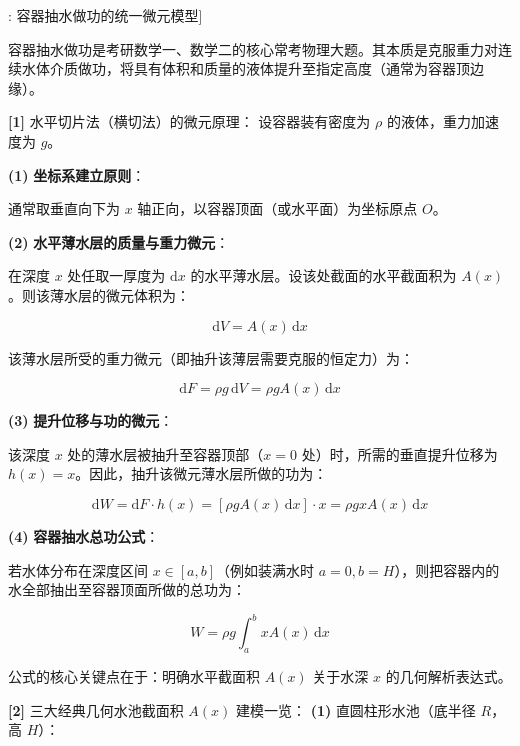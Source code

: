 \documentclass[11pt,a4paper,UTF8]{ctexart}
\begin{document}
\begin{thmbox}[模型[1]: 容器抽水做功的统一微元模型]

容器抽水做功是考研数学一、数学二的核心常考物理大题。其本质是克服重力对连续水体介质做功，将具有体积和质量的液体提升至指定高度（通常为容器顶边缘）。

\textbf{[1]} 水平切片法（横切法）的微元原理：
设容器装有密度为 $\rho$ 的液体，重力加速度为 $g$。

\textbf{(1)}  \textbf{坐标系建立原则}：

通常取垂直向下为 $x$ 轴正向，以容器顶面（或水平面）为坐标原点 $O$。

\textbf{(2)}  \textbf{水平薄水层的质量与重力微元}：

在深度 $x$ 处任取一厚度为 $\mathrm{d}x$ 的水平薄水层。设该处截面的水平截面积为 $A(x)$。则该薄水层的微元体积为：


\begin{equation*}
\mathrm{d}V = A(x)\,\mathrm{d}x
\end{equation*}


该薄水层所受的重力微元（即抽升该薄层需要克服的恒定力）为：


\begin{equation*}
\mathrm{d}F = \rho g\,\mathrm{d}V = \rho g A(x)\,\mathrm{d}x
\end{equation*}


\textbf{(3)}  \textbf{提升位移与功的微元}：

该深度 $x$ 处的薄水层被抽升至容器顶部（$x = 0$ 处）时，所需的垂直提升位移为 $h(x) = x$。因此，抽升该微元薄水层所做的功为：


\begin{equation*}
\mathrm{d}W = \mathrm{d}F \cdot h(x) = [\rho g A(x)\,\mathrm{d}x] \cdot x = \rho g x A(x)\,\mathrm{d}x
\end{equation*}


\textbf{(4)}  \textbf{容器抽水总功公式}：

若水体分布在深度区间 $x \in [a, b]$（例如装满水时 $a = 0, b = H$），则把容器内的水全部抽出至容器顶面所做的总功为：


\begin{equation*}
W = \rho g \int_a^b x A(x)\,\mathrm{d}x
\end{equation*}


公式的核心关键点在于：\textit{}明确水平截面积 $A(x)$ 关于水深 $x$ 的几何解析表达式\textit{}。

\textbf{[2]} 三大经典几何水池截面积 $A(x)$ 建模一览：
\textbf{(1)}  \textit{}直圆柱形水池（底半径 $R$，高 $H$）\textit{}：


\end{thmbox}
\end{document}
